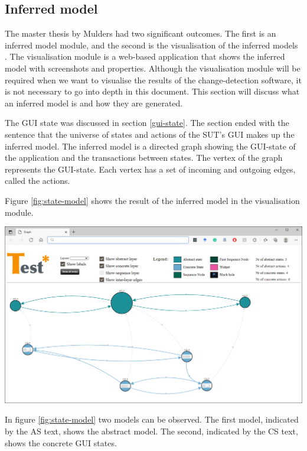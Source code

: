 \subsection{Inferred model} \label{inferred-model}
The master thesis by Mulders had two significant outcomes. The first is an inferred model module, and the second is the visualisation of the inferred models \cite{thesisMulders}. The visualisation module is a web-based application that shows the inferred model with screenshots and properties. Although the visualisation module will be required when we want to visualise the results of the change-detection software, it is not necessary to go into depth in this document. This section will discuss what an inferred model is and how they are generated. 

The GUI state was discussed in section \ref{gui-state}. The section ended with the sentence that the universe of states and actions of the SUT's GUI makes up the inferred model. The inferred model is a directed graph showing the GUI-state of the application and the transactions between states. The vertex of the graph represents the GUI-state. Each vertex has a set of incoming and outgoing edges, called the actions. 

Figure \ref{fig:state-model} shows the result of the inferred model in the visualisation module.

\bigskip
\begingroup
\captionsetup{type=figure}
\includegraphics[scale=0.38]{images/state-model.png}
\label{fig:state-model}
\endgroup

In figure \ref{fig:state-model} two models can be observed. The first model, indicated by the AS text, shows the abstract model. The second, indicated by the CS text, shows the concrete GUI states. 

